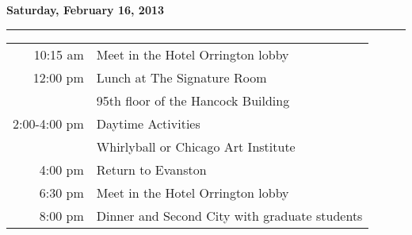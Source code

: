 \documentclass{article}
\begin{document}
\vspace*{1.5\baselineskip}
\centerline{\textbf{Saturday, February 16, 2013}}
\vspace*{0.25\baselineskip}
\hrule
\vspace*{0.25\baselineskip}

\hspace{5cm}
\begin{tabular}{ r    l }

10:15 am        & Meet in the Hotel Orrington lobby \rule{0cm}{0.6cm} \\ 

12:00 pm        & Lunch at The Signature Room \rule{0cm}{0.4cm} \\ 
                & \hspace{5mm} 95th floor of the Hancock Building \rule{0cm}{0.4cm} \\ 

2:00-4:00 pm    & Daytime Activities \rule{0cm}{0.4cm} \\ 
                & \hspace{5mm} Whirlyball or Chicago Art Institute \\ 

4:00 pm         & Return to Evanston \rule{0cm}{0.4cm} \\ 

6:30 pm         & Meet in the Hotel Orrington lobby \rule{0cm}{0.4cm} \\ 

8:00 pm         & Dinner and Second City with graduate students \rule{0cm}{0.4cm} \\

\end{tabular}
\end{document}
